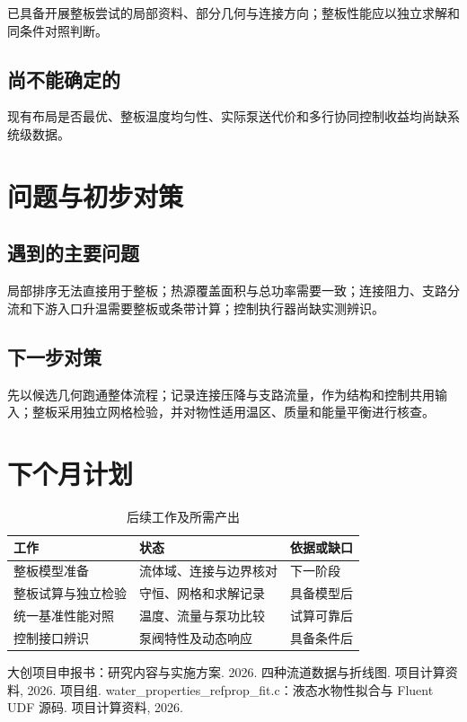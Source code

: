 \documentclass[stage2,fontset=fandol]{ydzjreport}
\begin{document}
已具备开展整板尝试的局部资料、部分几何与连接方向；整板性能应以独立求解和同条件对照判断。

\subsection{尚不能确定的}

现有布局是否最优、整板温度均匀性、实际泵送代价和多行协同控制收益均尚缺系统级数据。

\section{问题与初步对策}

\subsection{遇到的主要问题}

局部排序无法直接用于整板；热源覆盖面积与总功率需要一致；连接阻力、支路分流和下游入口升温需要整板或条带计算；控制执行器尚缺实测辨识。

\subsection{下一步对策}

先以候选几何跑通整体流程；记录连接压降与支路流量，作为结构和控制共用输入；整板采用独立网格检验，并对物性适用温区、质量和能量平衡进行核查。

\section{下个月计划}

\begin{table}[H]\centering
\caption{后续工作及所需产出}\label{tab:plan}
\begin{tabularx}{\textwidth}{@{}Y Y Y@{}}
\toprule
{} 工作 & 状态 & 依据或缺口 \\
\midrule
整板模型准备 & 流体域、连接与边界核对 & 下一阶段 \\
整板试算与独立检验 & 守恒、网格和求解记录 & 具备模型后 \\
统一基准性能对照 & 温度、流量与泵功比较 & 试算可靠后 \\
控制接口辨识 & 泵阀特性及动态响应 & 具备条件后 \\
\bottomrule\end{tabularx}\end{table}

\FloatBarrier
{}
\begin{thebibliography}{9}
 大创项目申报书：研究内容与实施方案. 2026.
 四种流道数据与折线图. 项目计算资料, 2026.
 项目组. water\_properties\_refprop\_fit.c：液态水物性拟合与 Fluent UDF 源码. 项目计算资料, 2026.
\end{thebibliography}
\end{document}
